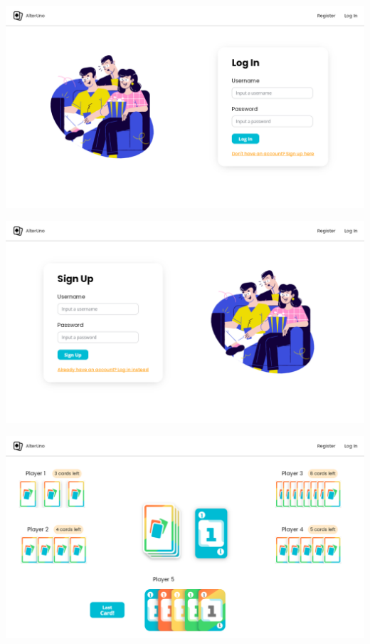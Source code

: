 \begin{center}
  \includegraphics[width=1\textwidth]{img/Mockup Log In}
   \label{fig:loginmockup}
\end{center}

\begin{center}
  \includegraphics[width=1\textwidth]{img/Mockup Sign Up}
   \label{fig:signupmockup}
\end{center}

\begin{center}
  \includegraphics[width=1\textwidth]{img/Mockup Game}
   \label{fig:gamemockup}
\end{center}


